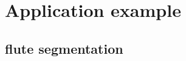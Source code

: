\documentclass{beamer}
\begin{document}
\section{Application example}
\subsection{flute segmentation}



	
	
	
\end{document}
